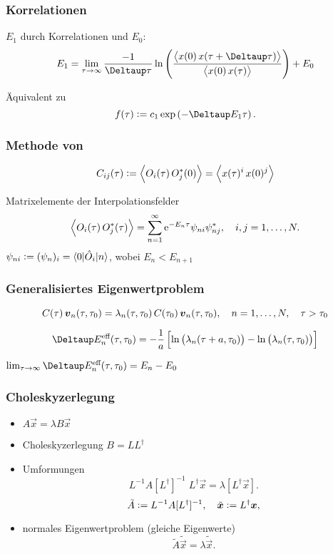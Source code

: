 \documentclass[ngerman, fleqn]{beamer}
\newcommand\timestep{a}
\renewcommand\eup{\text e}
\begin{document}
\begin{frame}
    \frametitle{Korrelationen}

    $E_1$ durch Korrelationen und $E_0$:
    \[
        E_1 = \lim_{\tau \to \infty} \frac{-1}{\Deltaup \tau} \ln
        \del{\frac{\Bracket{x(0) \, x(\tau + \Deltaup \tau)}}{\Bracket{x(0) \,
        x(\tau)}}} + E_0
    \]

    Äquivalent zu
    \[
        f(\tau) := c_1 \exp\del{-\Deltaup E_1 \tau}.
    \]
\end{frame}


\begin{frame}
    \frametitle{Methode von \cite{Blossier/Eigenvalue}}
\[
    C_{ij}(\tau) := \left\langle O_i(\tau) \, O_j^*(0) \right\rangle
    = \left\langle x(\tau)^i \, x(0)^j \right\rangle
\]
    
Matrixelemente der Interpolationsfelder
\[
    \Bracket{O_i(\tau) \, O_j^*(\tau)}
    = \sum_{n=1}^\infty \eup^{-E_n \tau} \psi_{ni} \psi_{nj}^*
    \eqnsep
    i, j = 1, \ldots, N.
\]
$\psi_{ni} := (\psi_n)_i = \braket{0 | \hat O_i | n}$, wobei $E_n < E_{n+1}$
\end{frame}

\begin{frame}
    \frametitle{Generalisiertes Eigenwertproblem}

\[
    C(\tau) \, \boldsymbol{v}_n(\tau, \tau_0) = \lambda_n(\tau, \tau_0) \, 
    C(\tau_0) \, \boldsymbol{v}_n(\tau, \tau_0)
    ,\quad
    n = 1, \ldots, N
    ,\quad
    \tau > \tau_0
\]

\[
    \Deltaup E_n^\text{eff}(\tau, \tau_0) = -
    \frac 1\timestep \sbr{ \ln\del{\lambda_n(\tau+\timestep, \tau_0)} -
    \ln\del{\lambda_n(\tau, \tau_0)} }
\]

$\lim_{\tau \to \infty} \Deltaup E_n^\text{eff}(\tau, \tau_0) = E_n - E_0$

\end{frame}



\begin{frame}
    \frametitle{Choleskyzerlegung}

    \begin{itemize}
        \item
            $A \vec x = \lambda B \vec x$

        \item
            Choleskyzerlegung $B = L L^\dagger$ 

        \item
            Umformungen
            \[
                L^{-1} A [L^\dagger]^{-1} \; L^\dagger \vec x
                =
                \lambda [L^\dagger \vec x].
            \]
            \[
                \tilde{A} := L^{-1} A [L^\dagger]^{-1}
                ,\quad
                \tilde{\boldsymbol{x}} := L^\dagger \boldsymbol{x},
            \]

        \item
            normales Eigenwertproblem (gleiche Eigenwerte)
            \[
                \tilde{A} \tilde{\vec x} = \lambda \tilde{\vec x}.
            \]
    \end{itemize}
\end{frame}
\end{document}
